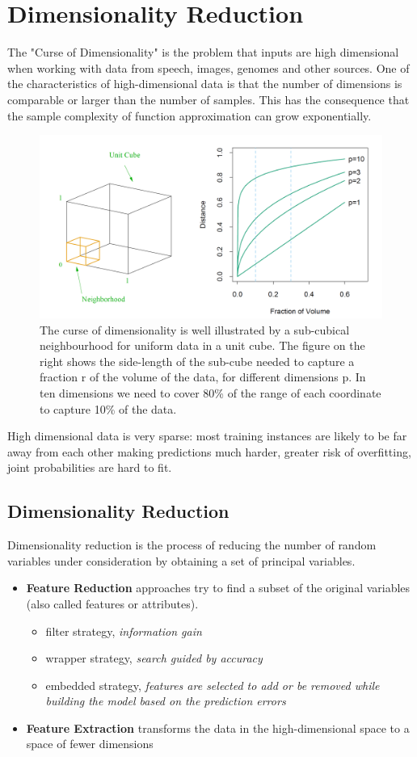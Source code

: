\documentclass[11pt]{article}
\theoremstyle{definition}
\begin{document}
\section{Dimensionality Reduction}
The "Curse of Dimensionality" is the problem that inputs are high dimensional when working with data from speech, images, genomes and other sources. One of the characteristics of high-dimensional data is that the number of dimensions is comparable or larger than the number of samples. This has the consequence that the sample complexity of function approximation can grow exponentially.

\begin{figure}[H]
	\centering
	\includegraphics[width=0.6\linewidth]{img/curse_dimensionality}
	\caption{The curse of dimensionality is well illustrated by a sub-cubical neighbourhood for uniform data in a unit cube. The figure on the right shows the side-length of the sub-cube needed to capture a fraction r of the volume of the data, for different dimensions p. In ten dimensions we need to cover 80\% of the range of each coordinate to capture 10\% of the data.}
	\label{fig:cursedimensionality}
\end{figure}

High dimensional data is very sparse: most training instances are likely to be far away from each other making predictions much harder, greater risk of overfitting, joint probabilities are hard to fit.

\subsection{Dimensionality Reduction}
Dimensionality reduction is the process of reducing the number of random variables under consideration by obtaining a set of principal variables.
\begin{itemize}
	\item \textbf{Feature Reduction} approaches try to find a subset of the original variables (also called features or attributes).
	\begin{itemize}
		\item filter strategy, \emph{information gain}
		\item wrapper strategy, \emph{search guided by accuracy}
		\item embedded strategy, \emph{features are selected to add or be removed while building the model based on the prediction errors}
	\end{itemize}
	\item \textbf{Feature Extraction} transforms the data in the high-dimensional space to a space of fewer dimensions
\end{itemize}
\end{document}
